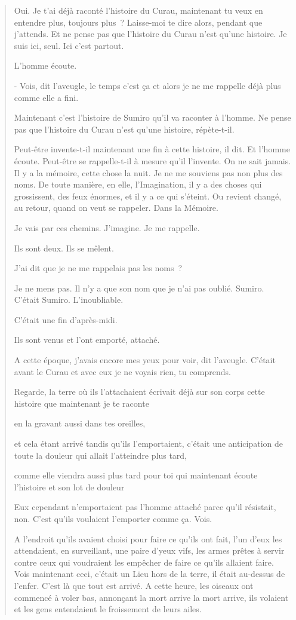 \begin{quote}
Oui. Je t'ai déjà raconté l'histoire du Curau, maintenant tu veux en
entendre plus, toujours plus~? Laisse-moi te dire alors, pendant que
j'attends. Et ne pense pas que l'histoire du Curau n'est qu'une
histoire. Je suis ici, seul. Ici c'est partout.

L'homme écoute.

- Vois, dit l'aveugle, le temps c'est ça et alors je ne me rappelle déjà
plus comme elle a fini.

Maintenant c'est l'histoire de Sumiro qu'il va raconter à l'homme. Ne
pense pas que l'histoire du Curau n'est qu'une histoire, répète-t-il.

Peut-être invente-t-il maintenant une fin à cette histoire, il dit. Et
l'homme écoute. Peut-être se rappelle-t-il à mesure qu'il l'invente. On
ne sait jamais. Il y a la mémoire, cette chose la nuit. Je ne me
souviens pas non plus des noms. De toute manière, en elle,
l'Imagination, il y a des choses qui grossissent, des feux énormes, et
il y a ce qui s'éteint. Ou revient changé, au retour, quand on veut se
rappeler. Dans la Mémoire.

Je vais par ces chemins. J'imagine. Je me rappelle.

Ils sont deux. Ils se mêlent.

J'ai dit que je ne me rappelais pas les noms~?

Je ne mens pas. Il n'y a que son nom que je n'ai pas oublié. Sumiro.
C'était Sumiro. L'inoubliable.

C'était une fin d'après-midi.

Ils sont venus et l'ont emporté, attaché.

A cette époque, j'avais encore mes yeux pour voir, dit l'aveugle.
C'était avant le Curau et avec eux je ne voyais rien, tu comprends.

Regarde, la terre où ils l'attachaient écrivait déjà sur son corps cette
histoire que maintenant je te raconte

en la gravant aussi dans tes oreilles,

et cela étant arrivé tandis qu'ils l'emportaient, c'était une
anticipation de toute la douleur qui allait l'atteindre plus tard,

comme elle viendra aussi plus tard pour toi qui maintenant écoute
l'histoire et son lot de douleur

Eux cependant n'emportaient pas l'homme attaché parce qu'il résistait,
non. C'est qu'ils voulaient l'emporter comme ça. Vois.

A l'endroit qu'ils avaient choisi pour faire ce qu'ils ont fait, l'un
d'eux les attendaient, en surveillant, une paire d'yeux vifs, les armes
prêtes à servir contre ceux qui voudraient les empêcher de faire ce
qu'ils allaient faire. Vois maintenant ceci, c'était un Lieu hors de la
terre, il était au-dessus de l'enfer. C'est là que tout est arrivé. A
cette heure, les oiseaux ont commencé à voler bas, annonçant la mort
arrive la mort arrive, ils volaient et les gens entendaient le
froissement de leurs ailes.


\end{quote}
